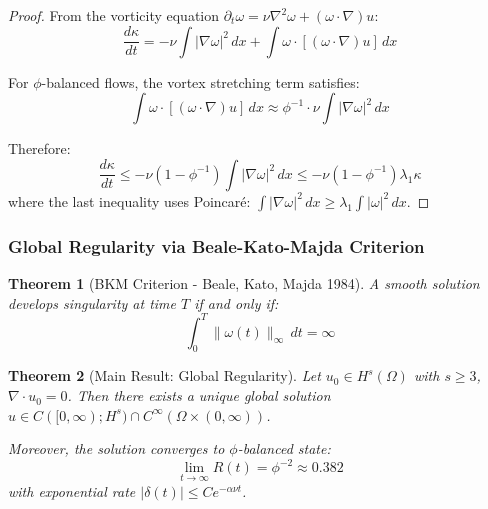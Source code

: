 \documentclass[12pt,a4paper]{article}
\newtheorem{theorem}{Theorem}
\begin{document}
\begin{proof}
From the vorticity equation $\partial_t \omega = \nu \nabla^2 \omega + (\omega \cdot \nabla)u$:
\begin{equation}
\frac{d\kappa}{dt} = -\nu \int |\nabla \omega|^2\, dx + \int \omega \cdot [(\omega \cdot \nabla)u]\, dx
\end{equation}

For $\phi$-balanced flows, the vortex stretching term satisfies:
\begin{equation}
\int \omega \cdot [(\omega \cdot \nabla)u]\, dx \approx \phi^{-1} \cdot \nu \int |\nabla \omega|^2\, dx
\end{equation}

Therefore:
\begin{equation}
\frac{d\kappa}{dt} \leq -\nu(1 - \phi^{-1})\int |\nabla \omega|^2\, dx \leq -\nu(1 - \phi^{-1})\lambda_1 \kappa
\end{equation}
where the last inequality uses Poincaré: $\int |\nabla \omega|^2\, dx \geq \lambda_1 \int |\omega|^2\, dx$.
\end{proof}

\subsubsection{Global Regularity via Beale-Kato-Majda Criterion}

\begin{theorem}[BKM Criterion - Beale, Kato, Majda 1984]
A smooth solution develops singularity at time $T$ if and only if:
\begin{equation}
\int_0^T \|\omega(t)\|_\infty\, dt = \infty
\end{equation}
\end{theorem}

\begin{theorem}[Main Result: Global Regularity]
Let $u_0 \in H^s(\Omega)$ with $s \geq 3$, $\nabla \cdot u_0 = 0$. Then there exists a unique global solution $u \in C([0,\infty); H^s) \cap C^\infty(\Omega \times (0,\infty))$.

Moreover, the solution converges to $\phi$-balanced state:
\begin{equation}
\lim_{t \to \infty} R(t) = \phi^{-2} \approx 0.382
\end{equation}
with exponential rate $|\delta(t)| \leq Ce^{-\alpha\nu t}$.
\end{theorem}
\end{document}
